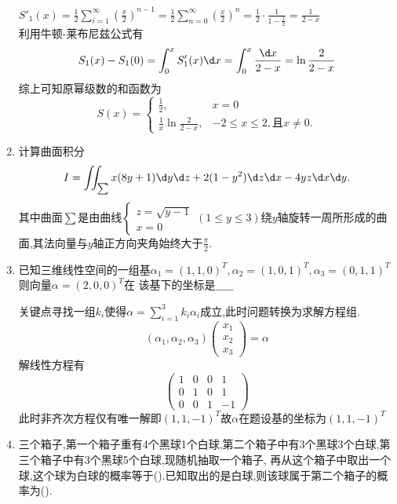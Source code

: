 \documentclass[12pt, a4paper, oneside, UTF8]{ctexbook}
\begin{document}
\begin{enumerate}
\begin{solution}
        $S'_1(x)=\frac{1}{2}\sum_{i=1}^{\infty}\left(\frac{x}{2}\right)^{n-1}=\frac{1}{2}\sum_{n=0}^{\infty}\left(\frac{x}{2}\right)^n=\frac{1}{2}\cdot\frac{1}{1-\frac{1}{2}}=\frac{1}{2-x}$ \\
        利用牛顿-莱布尼兹公式有
        $$
        S_1(x)-S_1(0) = \int_{0}^{x}S'_1(x)\d x = \int_{0}^{x}\frac{\d x}{2 - x} = \ln\frac{2}{2-x}
        $$
        综上可知原幂级数的和函数为
        $$
        S(x) = \begin{cases}
            \frac{1}{2}, &x=0 \\
            \frac{1}{x}\ln{\frac{2}{2-x}}, & -2\leq x\leq 2,\text{且}x\neq 0.
        \end{cases}
        $$
    \end{solution}
    \item 计算曲面积分
    $$
    I = \iint_{\sum}x(8y+1)\d y\d z + 2(1-y^2)\d z\d x - 4yz\d x\d y. 
    $$
    其中曲面$\sum$是由曲线$\begin{cases}
        z = \sqrt{y-1} \\
        x = 0
    \end{cases}(1\leq y\leq 3)$绕$y$轴旋转一周所形成的曲面,其法向量与$y$轴正方向夹角始终大于$\frac{\pi}{2}$. 
    \begin{solution}
        
    \end{solution}
    \item 已知三维线性空间的一组基$\alpha_1=(1,1,0)^T,\alpha_2=(1,0,1)^T,\alpha_3=(0,1,1)^T$则向量$\alpha=(2,0,0)^T$在
    该基下的坐标是$\_\_\_\_\_$
    \begin{solution}
        关键点寻找一组$k_i$使得$\alpha = \sum_{i=1}^{3}k_i\alpha_i$成立,此时问题转换为求解方程组. 
        $$
        (\alpha_1,\alpha_2,\alpha_3)\begin{pmatrix}
            x_1 \\
            x_2 \\
            x_3
        \end{pmatrix} = \alpha
        $$
        解线性方程有
        $$
        \begin{pmatrix}
            1 & 0 & 0 & 1\\
            0 & 1 & 0 & 1\\
            0 & 0 & 1 & -1
        \end{pmatrix}
        $$
        此时非齐次方程仅有唯一解即$(1,1,-1)^{T}$故$\alpha$在题设基的坐标为$(1,1,-1)^T$
    \end{solution}
    \item 三个箱子,第一个箱子重有4个黑球1个白球,第二个箱子中有3个黑球3个白球,第三个箱子中有3个黑球5个白球,现随机抽取一个箱子,
    再从这个箱子中取出一个球,这个球为白球的概率等于(\qquad).已知取出的是白球,则该球属于第二个箱子的概率为(\qquad).


\end{enumerate}
\end{document}
